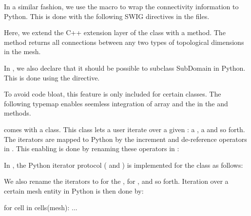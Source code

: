 In a similar fashion, we use the  macro to wrap the connectivity information to Python. This is done with the following SWIG directives in the  files.
Here, we extend the C++ extension layer of the
 class with a 
method. The method returns all connections between any two types of topological dimensions in the mesh.

In , we also declare that it should be possible to subclass SubDomain in Python. This is done using the  directive.
\begin{c++}
\end{c++}
To avoid code bloat, this feature is only included for certain classes.
The following typemap enables seemless integration of
\numpy array and the  in  
the  and  methods. 

\dolfin comes with a \-\- class. This
class lets a user iterate over a given : a ,
a  and so forth. The iterators are mapped to Python by the
increment and de-reference operators in . This
enabling is done by renaming these operators in :
\begin{c++}
\end{c++}
In , the Python iterator
protocol ( and ) is implemented for the
 class as
follows:
We also rename the iterators to  for the ,  for , and so forth. Iteration over a certain mesh entity in Python is then done by:
\begin{python}
for cell in cells(mesh):
    ...
\end{python}

